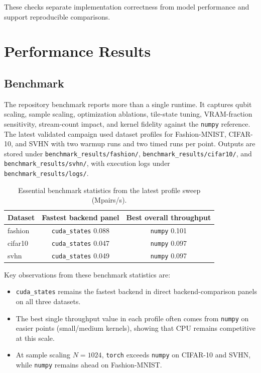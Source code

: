 \documentclass[10pt,twocolumn,letterpaper]{article}
\begin{document}
These checks separate implementation correctness from model performance and support reproducible comparisons.

\section{Performance Results}
\subsection{Benchmark}
The repository benchmark reports more than a single runtime. It captures qubit scaling, sample scaling, optimization ablations, tile-state tuning, VRAM-fraction sensitivity, stream-count impact, and kernel fidelity against the \texttt{numpy} reference. The latest validated campaign used dataset profiles for Fashion-MNIST, CIFAR-10, and SVHN with two warmup runs and two timed runs per point. Outputs are stored under \texttt{benchmark\_results/fashion/}, \texttt{benchmark\_results/cifar10/}, and \texttt{benchmark\_results/svhn/}, with execution logs under \texttt{benchmark\_results/logs/}.

\begin{table}[t]
\centering
\caption{Essential benchmark statistics from the latest profile sweep (Mpairs/s).}
\label{tab:benchmark}
\small
\begin{tabular}{lcc}
\toprule
\textbf{Dataset} & \textbf{Fastest backend panel} & \textbf{Best overall throughput} \\
\midrule
fashion & \texttt{cuda\_states} 0.088 & \texttt{numpy} 0.101 \\
cifar10 & \texttt{cuda\_states} 0.047 & \texttt{numpy} 0.097 \\
svhn & \texttt{cuda\_states} 0.049 & \texttt{numpy} 0.097 \\
\bottomrule
\end{tabular}
\end{table}

Key observations from these benchmark statistics are:
\begin{itemize}
    \item \texttt{cuda\_states} remains the fastest backend in direct backend-comparison panels on all three datasets.
    \item The best single throughput value in each profile often comes from \texttt{numpy} on easier points (small/medium kernels), showing that CPU remains competitive at this scale.
    \item At sample scaling $N=1024$, \texttt{torch} exceeds \texttt{numpy} on CIFAR-10 and SVHN, while \texttt{numpy} remains ahead on Fashion-MNIST.
\end{itemize}
\end{document}

